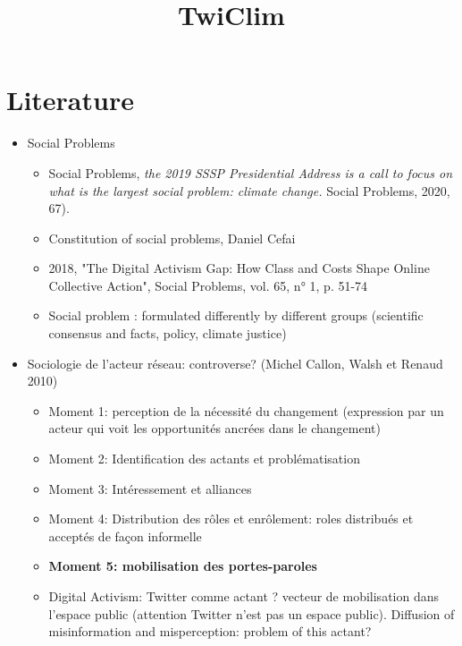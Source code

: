 \documentclass{article}
\begin{document}
\title{ TwiClim}
\date{}
\maketitle
\onehalfspace
\section*{Literature}
\begin{itemize}
	\item Social Problems 
		\begin{itemize} 	
			\item Social Problems, {\it the 2019 SSSP Presidential Address is a {\color{purple}call to focus on what is the largest social problem: climate change}.} Social Problems, 2020, 67). 
			\item Constitution of social problems, Daniel Cefai
			
			
			\item 2018, "The Digital Activism Gap: How Class and Costs Shape Online Collective Action", Social Problems, vol. 65, n° 1, p. 51-74
			\item Social problem : formulated differently by different groups (scientific consensus and facts, policy, climate justice)
		\end{itemize}
		\item Sociologie de l'acteur r\'{e}seau: controverse? (Michel Callon, Walsh et Renaud 2010)
				\begin{itemize}
					\item	Moment 1: {\color{purple}perception de la n\'{e}cessit\'{e} du changement} (expression par un acteur qui voit les opportunités ancrées dans le changement)
					\item Moment 2: Identification des actants et probl\'{e}matisation 
					\item Moment 3: Int\'{e}ressement et alliances 
					\item Moment 4: Distribution des r\^{o}les et enr\^{o}lement: roles distribu\'{e}s et accept\'{e}s de fa\c{c}on informelle
					\item {\bf Moment 5: mobilisation des portes-paroles}
					\item Digital Activism: Twitter comme actant ? vecteur de mobilisation dans l'espace public (attention Twitter n'est pas un espace public). Diffusion of misinformation and misperception: problem of this actant? 
				

\end{itemize}
\end{itemize}
\end{document}
